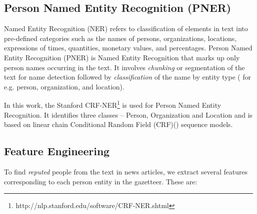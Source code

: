 \documentclass[a4paper,man,natbib]{apa6}
\begin{document}

\subsection{Person Named Entity Recognition (PNER)}
\label{ner}

\noindent Named Entity Recognition (NER) refers to classification of elements in text into pre-defined categories such as the names of persons, organizations, locations, expressions of times, quantities, monetary values, and percentages. 
Person Named Entity Recognition (PNER) is Named Entity Recognition that marks up only person names occurring in the text. It involves \emph{chunking} or segmentation of  the text for name detection followed by \emph{classification} of the name by entity type ( for e.g. person, organization, and location).


In this work, the Stanford CRF-NER\footnote{http://nlp.stanford.edu/software/CRF-NER.shtml} is used for Person Named Entity Recognition. It identifies three classes -- Person, Organization and Location and is based on linear chain Conditional Random Field (CRF)(\cite{mccallum2003early, finkel2005incorporating, sutton2011introduction}) sequence models. 

\subsection{Feature Engineering} 
To find \emph{reputed} people from the text in news articles, we extract several features corresponding to each person entity in the gazetteer. These are:
\end{document}
